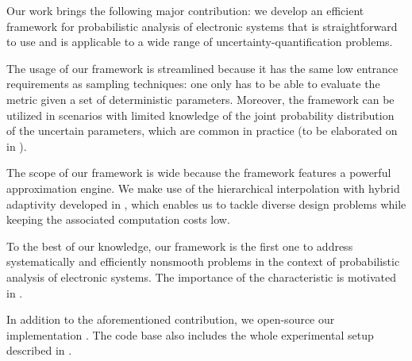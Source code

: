 Our work brings the following major contribution: we develop an efficient
framework for probabilistic analysis of electronic systems that is
straightforward to use and is applicable to a wide range of
uncertainty-quantification problems.

The usage of our framework is streamlined because it has the same low entrance
requirements as sampling techniques: one only has to be able to evaluate the
metric given a set of deterministic parameters. Moreover, the framework can be
utilized in scenarios with limited knowledge of the joint probability
distribution of the uncertain parameters, which are common in practice (to be
elaborated on in ).

The scope of our framework is wide because the framework features a powerful
approximation engine. We make use of the hierarchical interpolation with hybrid
adaptivity developed in \cite{jakeman2012, klimke2006, ma2009}, which enables us
to tackle diverse design problems while keeping the associated computation costs
low.

To the best of our knowledge, our framework is the first one to address
systematically and efficiently nonsmooth problems in the context of
probabilistic analysis of electronic systems. The importance of the
characteristic is motivated in .

In addition to the aforementioned contribution, we open-source our
implementation \cite{sources}. The code base also includes the whole
experimental setup described in .
